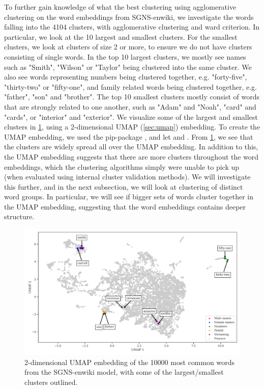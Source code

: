 To further gain knowledge of what the best clustering using agglomerative clustering on the word embeddings from SGNS-enwiki, we investigate the words falling into the 4104 clusters, with agglomerative clustering and ward criterion. In particular, we look at the 10 largest and smallest clusters. For the smallest clusters, we look at clusters of size 2 or more, to ensure we do not have clusters consisting of single words. In the top 10 largest clusters, we mostly see names such as "Smith", "Wilson" or "Taylor" being clustered into the same cluster. We also see words representing numbers being clustered together, e.g. "forty-five", "thirty-two" or "fifty-one", and family related words being clustered together, e.g. "father", "son" and "brother". The top 10 smallest clusters mostly consist of words that are strongly related to one another, such as "Adam" and "Noah", "card" and "cards", or "interior" and "exterior". We visualize some of the largest and smallest clusters in \cref{fig:cluster-analysis-agglomerative-2d-umap-top-clusters}, using a 2-dimensional UMAP (\cref{sec:umap}) embedding. To create the UMAP embedding, we used the  pip-package \cite{mcinnes2018umap-software}, and let  and . From \cref{fig:cluster-analysis-agglomerative-2d-umap-top-clusters}, we see that the clusters are widely spread all over the UMAP embedding. In addition to this, the UMAP embedding suggests that there are more clusters throughout the word embeddings, which the clustering algorithms simply were unable to pick up (when evaluated using internal cluster validation methods). We will investigate this further, and in the next subsection, we will look at clustering of distinct word groups. In particular, we will see if bigger sets of words cluster together in the UMAP embedding, suggesting that the word embeddings contains deeper structure.
\begin{figure}
    \centering
    \includegraphics[width=\textwidth]{thesis/figures/cluster-analysis-agglomerative-2d-umap-top-clusters.pdf}
    \caption{2-dimensional UMAP embedding of the 10000 most common words from the SGNS-enwiki model, with some of the largest/smallest clusters outlined.}
    \label{fig:cluster-analysis-agglomerative-2d-umap-top-clusters}
\end{figure}

